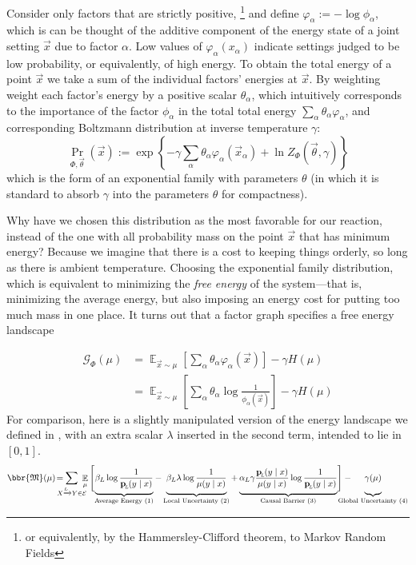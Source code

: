 \documentclass{article}
\theoremstyle{plain}
\theoremstyle{definition}
\theoremstyle{remark}
\let\H\relax
\DeclareMathOperator{\H}{\mathrm{H}} %
\DeclareMathOperator*{\E}{\mathbb{E}} %
\newcommand\mat[1]{\mathbf{#1}}
\newcommand{\bp}[1][L]{\mat{p}_{\!_{#1}\!}}
\newcommand{\Ed}{\mathcal E}
\newcommand{\dg}[1]{\mathfrak{#1}}
\numberwithin{equation}{section}
\begin{document}
	Consider only factors that are strictly positive,%
		\footnote{or equivalently, by the Hammersley-Clifford theorem, to Markov Random Fields}
	and define $ \varphi_\alpha := -\log \phi_\alpha$, which is can be thought of the additive component of the energy state of a joint setting $\vec x$ due to factor $\alpha$. 
	Low values of $\varphi_\alpha(x_\alpha)$ indicate settings judged to be low probability, or equivalently, of high energy. 
	To obtain the total energy of a point $\vec x$ we take a sum of the individual factors' energies at $\vec x$. By weighting weight each factor's energy by a positive scalar $\theta_\alpha$, which intuitively corresponds to the importance of the factor $\phi_\alpha$ in the total total energy $\sum_\alpha \theta_\alpha \varphi_\alpha$,
	and corresponding Boltzmann distribution at inverse temperature $\gamma$:
	\[ \Pr_{\Phi, \vec\theta} (\vec x)  := \exp \left\{ -\gamma \sum_\alpha \theta_\alpha \varphi_\alpha(\vec x_\alpha)  + \ln Z_\Phi(\vec \theta, \gamma) \right\} \] 
	which is the form of an exponential family with parameters $\theta$ (in which it is standard to absorb $\gamma$ into the parameters $\theta$ for compactness).
	
	Why have we chosen this distribution as the most favorable for our reaction, instead of the one with all probability mass on the point $\vec x$ that has minimum energy? Because we imagine that there is a cost to keeping things orderly, so long as there is ambient temperature. Choosing the exponential family distribution, which is equivalent to minimizing the \emph{free energy} of the system---that is, minimizing the average energy, but also imposing an energy cost for putting too much mass in one place. It turns out that a factor graph specifies a free energy landscape
	
	\begin{align*}
		\mathcal G_\Phi(\mu) &=  \E_{\vec x \sim \mu} \left[\sum_\alpha \theta_\alpha \varphi_\alpha(\vec x) \right] - \gamma H(\mu) \\
			&= \E_{\vec x \sim \mu} \left[\sum_\alpha \theta_\alpha \log \frac{1}{\phi_\alpha(\vec x)} \right] - \gamma H(\mu)
	\end{align*}
	For comparison, here is a slightly manipulated version of the energy landscape we defined in , with an extra scalar $\lambda$ inserted in the second term, intended to lie in $[0,1]$.
	\begin{equation*}
		\bbr{\dg M}(\mu) \!=\mskip-18mu \sum_{ X \xrightarrow{\!\!L} Y  \in \Ed } \!\!\!\!\E_\mu  \Bigg[\!
			\underbrace{\beta_L \log \frac{1}{\bp(y\mid x)} \vphantom{\Bigg|}}_{\text{Average Energy (1)}}  - 
			\underbrace{\beta_L \lambda \log \frac{1}{\mu(y \mid x)}  \vphantom{\Bigg|}}_{\text{Local Uncertainty (2)}}  + 
			\underbrace{\alpha_L \gamma \frac{\bp(y \mid x)}{\mu(y \mid x)}\log \frac{1}{\bp(y\mid x)}  \vphantom{\Bigg|}}_{\text{Causal Barrier (3)}}\! \Bigg] - 
			\mskip-31mu\underbrace{\gamma \H(\mu) \vphantom{\Bigg|} }_{\text{Global Uncertainty (4)}}
	\end{equation*}
\end{document}
